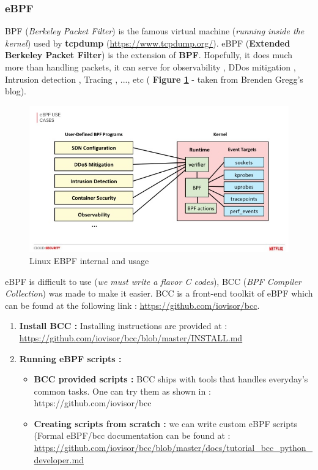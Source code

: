 \subsubsection{eBPF}
BPF (\textit{Berkeley Packet Filter}) is the famous virtual machine (\textit{running inside the kernel}) used by \textbf{tcpdump} ({\color{blue}\url{https://www.tcpdump.org/}}).
eBPF (\textbf{Extended Berkeley Packet Filter}) is the extension of \textbf{BPF}. Hopefully, it does much more than handling packets, it can serve for observability , DDos mitigation , Intrusion detection , Tracing , ..., etc ( \textbf{Figure \ref{Linux EBPF internal and usage}} - taken from Brenden Gregg's blog).
					\begin{figure}[H]
						\centering
        				\includegraphics[scale=0.4]{img/solution/security-monitoring-with-ebpf-11-638.jpg}
        				\caption{Linux EBPF internal and usage}
        				\label{Linux EBPF internal and usage}
    				\end{figure}	

eBPF is difficult to use (\emph{we must write a flavor C codes}), BCC (\textit{BPF Compiler Collection}) was made to make it easier.
BCC is a front-end toolkit of eBPF which can be found at the following link : {\color{blue}\url{https://github.com/iovisor/bcc}}.


\begin{enumerate}
	\item \textbf{Install BCC : } Installing instructions are provided at : {\color{blue}\url{https://github.com/iovisor/bcc/blob/master/INSTALL.md}}
	
	\item \textbf{Running eBPF scripts : } 
		\begin{itemize}
			\item \textbf{BCC provided scripts : } BCC ships with tools that handles everyday's common tasks. One can try them as shown in : {\color{blue}https://github.com/iovisor/bcc}
			
			\item \textbf{Creating scripts from scratch : } we can write custom eBPF scripts (Formal eBPF/bcc documentation can be found at : {\color{blue}\url{https://github.com/iovisor/bcc/blob/master/docs/tutorial_bcc_python_developer.md}}
						
			
		\end{itemize}			
\end{enumerate}

